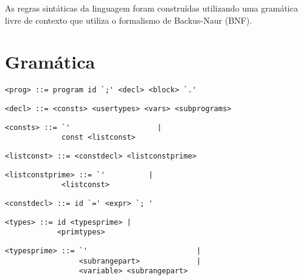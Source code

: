As regras sintáticas da linguagem foram construídas utilizando uma gramática livre de contexto que utiliza o formalismo de Backus-Naur (BNF).

\section{Gramática}

\begin{footnotesize}
\begin{lstlisting}[frame=single, label={prog}, language=pie]
<prog> ::= program id `;' <decl> <block> `.'
\end{lstlisting}

\begin{lstlisting}[frame=single, label={decl}, language=pie]
<decl> ::= <consts> <usertypes> <vars> <subprograms>
\end{lstlisting}

\begin{lstlisting}[frame=single, label={consts}, language=pie]
<consts> ::= `'                    |
             const <listconst>
\end{lstlisting}

\begin{lstlisting}[frame=single, label={listconst}, language=pie]
<listconst> ::= <constdecl> <listconstprime>
\end{lstlisting}

\begin{lstlisting}[frame=single, label={listconstprime}, language=pie]
<listconstprime> ::= `'          |
		     <listconst>
\end{lstlisting}

\begin{lstlisting}[frame=single, label={constdecl}, language=pie]
<constdecl> ::= id `=' <expr> `; '
\end{lstlisting}

\begin{lstlisting}[frame=single, label={types}, language=pie]
<types> ::= id <typesprime> |
            <primtypes>
\end{lstlisting}

\begin{lstlisting}[frame=single, label={typesprime}, language=pie]
<typesprime> ::= `'                         |
                 <subrangepart>             |
                 <variable> <subrangepart>

\end{lstlisting}


\end{footnotesize}
